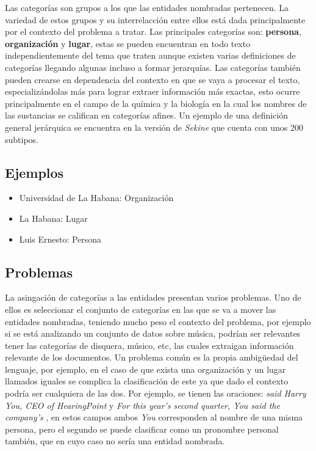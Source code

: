 \documentclass[runningheads]{llncs}
\begin{document}
Las categorías son grupos a los que las entidades nombradas pertenecen. La variedad de estos grupos y su interrelacción entre ellos está dada principalmente por el contexto del problema a tratar. Las principales categorías son: \textbf{persona}, \textbf{organización} y \textbf{lugar}, estas se pueden encuentran en todo texto independientemente del tema que traten aunque existen varias definiciones de categorías llegando algunas incluso a formar jerarquías. Las categorías también pueden crearse en dependencia del contexto en que se vaya a procesar el texto, especializándolas más para lograr extraer información más exactas, esto ocurre principalmente en el campo de la química y la biología en la cual los nombres de las sustancias se califican en categorías afines. Un ejemplo de una definición general jerárquica se encuentra en la versión de \emph{Sekine}\cite{sekine} que cuenta con unos 200 subtipos.

\subsection{Ejemplos}

\begin{itemize}

\item Universidad de La Habana: Organización
\item La Habana: Lugar
\item Luis Ernesto: Persona

\end{itemize}

\subsection{Problemas}

La asingación de categorías a las entidades presentan varios problemas. Uno de ellos es seleccionar el conjunto de categorías en las que se va a mover las entidades nombradas, teniendo mucho peso el contexto del problema, por ejemplo si se está analizando un conjunto de datos sobre música, podrían ser relevantes tener las categorías de disquera, músico, etc, las cuales extraigan información relevante de los documentos. Un problema común es la propia ambigüedad del lenguaje, por ejemplo, en el caso de que exista una organización y un lugar llamados iguales se complica la clasificación de este ya que dado el contexto podría ser cualquiera de las dos. Por ejemplo, se tienen las oraciones: \emph{said Harry You, CEO of HearingPoint} y \emph{For this year’s second quarter, You said the
company’s} \cite{semi_sup_for_ner}, en estos campos ambos \emph{You} corresponden al nombre de una misma persona, pero el segundo se puede clasificar como un pronombre personal también, que en cuyo caso no sería una entidad nombrada.
\end{document}
